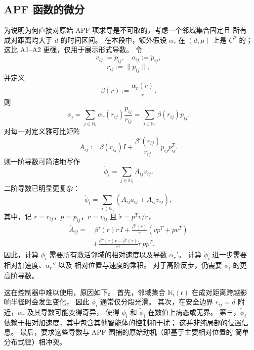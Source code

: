 \subsection{APF 函数的微分}

为说明为何直接对原始 APF 项求导是不可取的，考虑一个邻域集合固定且
所有成对距离均大于 $d$ 的时间区间。
在本段中，额外假设 $\alpha_r$ 在 $(d,\mu)$ 上是 $C^2$ 的；
这比 A1--A2 更强，仅用于展示形式导数。
令
\[
    v_{ij}:=\dot p_{ij},\quad
    a_{ij}:=\ddot p_{ij},
\]
\[
    r_{ij}:=\|p_{ij}\|,
\]
并定义
\[
    \beta(r):=\frac{\alpha_r(r)}{r}.
\]
则
\[
    \phi_i
    =\sum_{j\in\mathbb N_i}\alpha_r(r_{ij})
      \frac{p_{ij}}{r_{ij}}
    =\sum_{j\in\mathbb N_i}\beta(r_{ij})p_{ij}.
\]
对每一对定义雅可比矩阵
\[
    A_{ij}
    :=\beta(r_{ij})I
      +\frac{\beta'(r_{ij})}{r_{ij}}p_{ij}p_{ij}^{T}.
\]
则一阶导数可简洁地写作
\[
    \dot\phi_i
    =\sum_{j\in\mathbb N_i}A_{ij}v_{ij}.
\]
二阶导数已明显更复杂：
\[
    \ddot\phi_i
    =\sum_{j\in\mathbb N_i}
    \left(A_{ij}a_{ij}+\dot A_{ij}v_{ij}\right),
\]
其中，记 $r=r_{ij}$，$p=p_{ij}$，$v=v_{ij}$ 且
$\dot r=p^T v/r$，
\[
\begin{aligned}
    \dot A_{ij}
    =&\ \beta'(r)\dot r\, I
      +\frac{\beta'(r)}{r}
       \left(vp^T+pv^T\right)\\
     &+\frac{\beta''(r)r-\beta'(r)}{r^2}
       \dot r\,pp^T .
\end{aligned}
\]
因此，计算 $\dot\phi_i$ 需要所有激活邻域的相对速度以及导数 $\alpha_r'$。
计算 $\ddot\phi_i$ 进一步需要相对加速度、$\alpha_r''$ 以及
相对位置与速度的乘积。
对于高阶反步，仍需要 $\phi_i$ 的更高阶导数。

这在控制器中难以使用，原因如下。
首先，邻域集合 $\mathbb N_i(t)$ 在成对距离跨越影响半径时会发生变化，
因此 $\phi_i$ 通常仅分段光滑。
其次，在安全边界 $r_{ij}=d$ 附近，$\alpha_r$ 及其导数可能变得奇异，
使得 $\dot\phi_i$ 和 $\ddot\phi_i$ 在数值上病态或无界。
第三，$\ddot\phi_i$ 依赖于相对加速度，其中包含其他智能体的控制和干扰；
这并非纯局部的位置信息。
最后，要求这些导数与 APF 围捕的原始动机（即基于主要相对位置的
简单分布式律）相冲突。